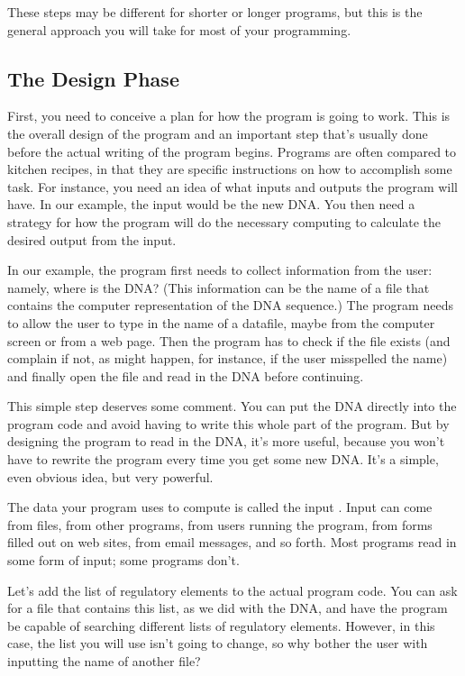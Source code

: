 These steps may be different for shorter or longer programs, but this is the general approach you will take for most of your programming.

\subsection{The Design Phase}
First, you need to conceive a plan for how the program is going to work.  This is the overall design of the program and an important step that's usually done before the actual writing of the program begins. Programs are often compared to kitchen recipes, in that they are specific instructions on how to accomplish some task. For instance, you need an idea of what inputs and outputs the program will have. In our example, the input would be the new DNA. You then need a strategy for how the program will do the necessary computing to calculate the desired output from the input.

In our example, the program first needs to collect information from the user: namely, where is the DNA? (This information can be the name of a file that contains the computer representation of the DNA sequence.) The program needs to allow the user to type in the name of a datafile, maybe from the computer screen or from a web page. Then the program has to check if the file exists (and complain if not, as might happen, for instance, if the user misspelled the name) and finally open the file and read in the DNA before continuing.

This simple step deserves some comment. You can put the DNA directly into the program code and avoid having to write this whole part of the program. But by designing the program to read in the DNA, it's more useful, because you won't have to rewrite the program every time you get some new DNA. It's a simple, even obvious idea, but very powerful.

The data your program uses to compute is called the input . Input can come from files, from other programs, from users running the program, from forms filled out on web sites, from email messages, and so forth.  Most programs read in some form of input; some programs don't.

Let's add the list of regulatory elements to the actual program code.  You can ask for a file that contains this list, as we did with the DNA, and have the program be capable of searching different lists of regulatory elements. However, in this case, the list you will use isn't going to change, so why bother the user with inputting the name of another file?

